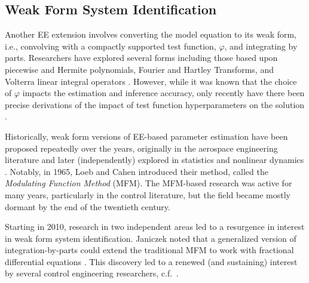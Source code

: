 \subsection{Weak Form System Identification}

Another EE extension involves converting the model equation to its weak form, i.e., convolving with a compactly supported test function, $\varphi$, and integrating by parts. Researchers have explored several forms including those based upon piecewise \citep{LoebCahen1965IEEETransAutomControl} and Hermite \citep{Takaya1968IEEETransAutomControl} polynomials, Fourier \citep{PearsonLee1985Control-TheoryAdvTechnol} and Hartley \citep{PatraUnbehauen1995IntJControl} Transforms, and Volterra linear integral operators \citep{PinAssaloneLoveraEtAl2015IEEETransAutomatContr,PinChenParisini2017Automatica}.  However, while it was known that the choice of $\varphi$ impacts the estimation and inference accuracy, only recently have there been precise derivations of the impact of test function hyperparameters on the solution \cite{BortzMessengerDukic2023BullMathBiol,GurevichReinboldGrigoriev2019Chaos,MessengerBortz2021JComputPhys,MessengerBortz2021MultiscaleModelSimul,MessengerBortz2024IMAJNumerAnal}.

Historically, weak form versions of EE-based parameter estimation have been proposed repeatedly over the years, originally in the aerospace engineering literature \citep{LoebCahen1965Automatisme,LoebCahen1965IEEETransAutomControl,Shinbrot1954NACATN3288,Shinbrot1957TransAmSocMechEng} and later (independently) explored in statistics \citep{BrunelClairondAlche-Buc2014JAmStatAssoc,HallMa2014JRStatSocB} and nonlinear dynamics \citep{BortzMessengerDukic2023BullMathBiol,LiuChangChen2016NonlinearDyn}.  Notably, in 1965, Loeb and Cahen \citep{LoebCahen1965Automatisme,LoebCahen1965IEEETransAutomControl} introduced their method, called the \emph{Modulating Function Method} (MFM). The MFM-based research was active for many years, particularly in the control literature, but the field became mostly dormant by the end of the twentieth century.

Starting in 2010, research in two independent areas led to a resurgence in interest in weak form system identification. Janiczek noted that a generalized version of integration-by-parts could extend the traditional MFM to work with fractional differential equations \citep{Janiczek2010BullPolAcadSciTechSci}. This discovery led to a renewed (and sustaining) interest by several control engineering researchers, c.f.~\citep{AldoghaitherLiuLaleg-Kirati2015SIAMJSciComput,JouffroyReger20152015IEEEConfControlApplCCA,LiuLaleg-Kirati2015SignalProcessing}.

